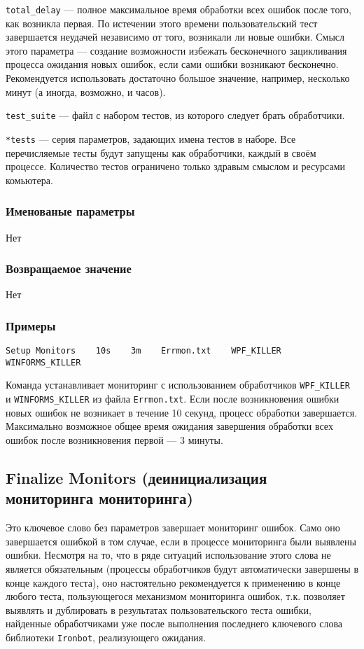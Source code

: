 \documentclass[11pt]{book} %
\begin{document}
\verb"total_delay" --- полное максимальное время обработки всех ошибок после того, как возникла первая. По истечении этого времени пользовательский тест завершается неудачей независимо от того, возникали ли новые ошибки. Смысл этого параметра --- создание возможности избежать бесконечного зацикливания процесса ожидания новых ошибок, если сами ошибки возникают бесконечно. Рекомендуется использовать достаточно большое значение, например, несколько минут (а иногда, возможно, и часов).

\verb"test_suite" --- файл с набором тестов, из которого следует брать обработчики.

\verb"*tests" --- серия параметров, задающих имена тестов в наборе. Все перечисляемые тесты будут запущены как обработчики, каждый в своём процессе. Количество тестов ограничено только здравым смыслом и ресурсами комьютера.


\subsubsection*{Именованые параметры} 
Нет


\subsubsection*{Возвращаемое значение} 
Нет

\subsubsection*{Примеры}
\begin{verbatim}Setup Monitors    10s    3m    Errmon.txt    WPF_KILLER    WINFORMS_KILLER\end{verbatim}

Команда устанавливает мониторинг с использованием обработчиков \verb|WPF_KILLER| и \verb|WINFORMS_KILLER| из файла \verb|Errmon.txt|. Если после возникновения ошибки новых ошибок не возникает в течение 10 секунд, процесс обработки завершается. Максимально возможное общее время ожидания завершения обработки всех ошибок после возникновения первой --- 3 минуты. 






\subsection{Finalize Monitors (деинициализация мониторинга мониторинга)}
    Это ключевое слово без параметров завершает мониторинг ошибок. Само оно завершается ошибкой в том случае, если в процессе мониторинга были выявлены ошибки. Несмотря на то, что в ряде ситуаций использование этого слова не является обязательным (процессы обработчиков будут автоматически завершены в конце каждого теста), оно настоятельно рекомендуется к применению в конце любого теста, пользующегося механизмом мониторинга ошибок, т.к. позволяет выявлять и дублировать в результатах пользовательского теста ошибки, найденные обработчиками уже после выполнения последнего ключевого слова библиотеки \verb|Ironbot|, реализующего ожидания.
\end{document}

